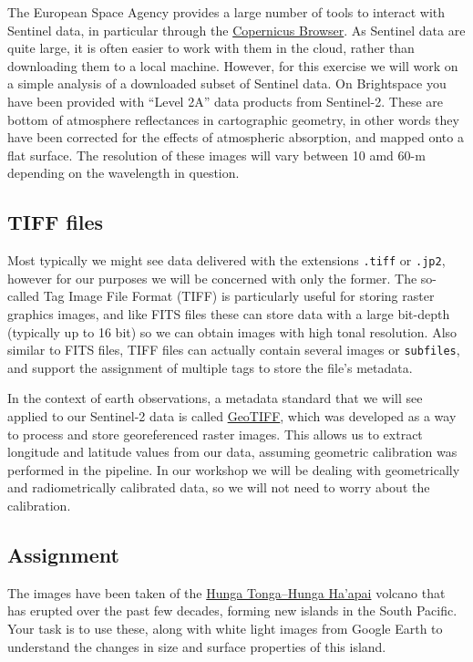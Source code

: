 \documentclass{tufte-book}
\begin{document}
The European Space Agency provides a large number of tools to interact with Sentinel data, in particular through the \href{https://browser.dataspace.copernicus.eu}{Copernicus Browser}. As Sentinel data are quite large, it is often easier to work with them in the cloud, rather than downloading them to a local machine. However, for this exercise we will work on a simple analysis of a downloaded subset of Sentinel data.
On Brightspace you have been provided with ``Level 2A'' data products from Sentinel-2. These are bottom of atmosphere reflectances in cartographic geometry, in  other words they have been corrected for the effects of atmospheric absorption, and mapped onto a flat surface. The resolution of these images will vary between 10 amd 60-m depending on the wavelength in question.

\subsection{TIFF files}

  Most typically we might see data delivered with the extensions \texttt{.tiff} or \texttt{.jp2}, however for our purposes we will be concerned with only the former. The so-called Tag Image File Format (TIFF) is particularly useful for storing raster graphics images, and like FITS files these can store data with a large bit-depth (typically up to 16 bit) so we can obtain images with high tonal resolution. Also similar to FITS files, TIFF files can actually contain several images or \texttt{subfiles}, and support the assignment of multiple tags to store the file's metadata. 

  In the context of earth observations, a metadata standard that we will see applied to our Sentinel-2 data is called \href{https://www.earthdata.nasa.gov/about/esdis/esco/standards-practices/geotiff}{GeoTIFF}, which was developed as a way to process and store georeferenced raster images. This allows us to extract longitude and latitude values from our data, assuming geometric calibration was performed in the pipeline. In our workshop we will be dealing with geometrically and radiometrically calibrated data, so we will not need to worry about the calibration.

\subsection{Assignment}

The images have been taken of the 
\href{https://en.wikipedia.org/wiki/Hunga_Tonga%E2%80%93Hunga_Ha%CA%BBapai}{Hunga Tonga–Hunga Ha'apai} volcano that has erupted over the past few decades, forming new islands in the South Pacific. 
Your task is to use these, along with white light images from Google Earth to understand the changes in size and surface properties of this island.
\end{document}
